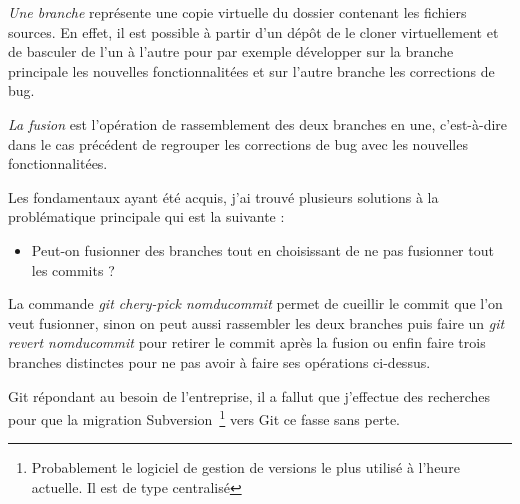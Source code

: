 \emph{Une branche} représente une \og copie virtuelle \fg{} du dossier contenant
les fichiers sources. En effet, il est possible à partir d'un dépôt de le
cloner virtuellement et de basculer de l'un à l'autre pour par exemple
développer sur la branche principale les nouvelles fonctionnalitées et sur
l'autre branche les corrections de bug.

\emph{La fusion} est l'opération de rassemblement des deux branches en une,
c'est-à-dire dans le cas précédent de regrouper les corrections de bug avec les
nouvelles fonctionnalitées.

Les fondamentaux ayant été acquis, j'ai trouvé plusieurs solutions à la
problématique principale qui est la suivante :
\begin{itemize}
    \item Peut-on fusionner des branches tout en choisissant de ne pas
fusionner tout les commits ?
\end{itemize}

La commande \emph{git chery-pick \og nomducommit \fg{}} permet de \og cueillir
\fg{} le commit que l'on veut fusionner, sinon on peut aussi rassembler les deux
branches puis faire un \emph{git revert \og nomducommit \fg{}} pour retirer le
commit après la fusion ou enfin faire trois branches distinctes pour ne pas
avoir à faire ses opérations ci-dessus.

Git répondant au besoin de l'entreprise, il a fallut que j'effectue des
recherches pour que la migration Subversion\, \footnote{Probablement le
logiciel de gestion de versions le plus utilisé à l’heure actuelle. Il est de
type centralisé} vers Git ce fasse sans perte.

\clearpage
